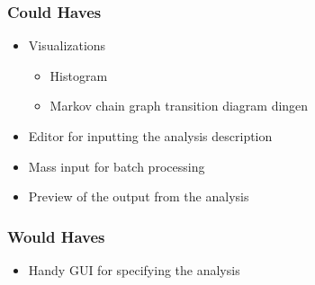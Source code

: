 \subsubsection{Could Haves}
\begin{itemize}
  \item Visualizations
  \begin{itemize}
	  \item Histogram
      \item Markov chain graph transition diagram dingen
  \end{itemize}
  \item Editor for inputting the analysis description
  \item Mass input for batch processing
  \item Preview of the output from the analysis
\end{itemize}

\subsubsection{Would Haves}
\begin{itemize}
	\item Handy GUI for specifying the analysis
\end{itemize}
